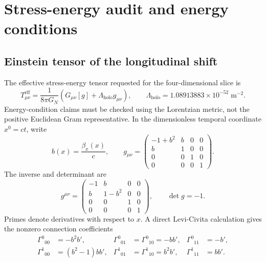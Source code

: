 \section{Stress-energy audit and energy conditions}\label{sec:stress-energy-audit}

\subsection{Einstein tensor of the longitudinal shift}

The effective stress-energy tensor requested for the four-dimensional slice is
\begin{equation}
  T_{\mu\nu}^{\mathrm{eff}}
  =
  \frac{1}{8\pi G_N}
  \left(
    G_{\mu\nu}[g]
    +
    \Lambda_{\mathrm{holo}}g_{\mu\nu}
  \right),
  \qquad
  \Lambda_{\mathrm{holo}}
  =
  1.08913883\times10^{-52}\;\mathrm{m^{-2}}.
  \label{eq:effective-stress-energy-definition}
\end{equation}
Energy-condition claims must be checked using the Lorentzian metric, not the
positive Euclidean Gram representative.  In the dimensionless temporal
coordinate \(x^0=ct\), write
\begin{equation}
  b(x)
  =
  \frac{\beta_x(x)}{c},
  \qquad
  g_{\mu\nu}
  =
  \begin{pmatrix}
    -1+b^2 & b & 0 & 0 \\
    b & 1 & 0 & 0 \\
    0 & 0 & 1 & 0 \\
    0 & 0 & 0 & 1
  \end{pmatrix}.
  \label{eq:section5-shift-metric}
\end{equation}
The inverse and determinant are
\begin{equation}
  g^{\mu\nu}
  =
  \begin{pmatrix}
    -1 & b & 0 & 0 \\
    b & 1-b^2 & 0 & 0 \\
    0 & 0 & 1 & 0 \\
    0 & 0 & 0 & 1
  \end{pmatrix},
  \qquad
  \det g
  =
  -1.
  \label{eq:section5-inverse-and-determinant}
\end{equation}
Primes denote derivatives with respect to \(x\).  A direct Levi-Civita
calculation gives the nonzero connection coefficients
\begin{equation}
  \begin{aligned}
  \Gamma^{0}{}_{00}
  &=
  -b^2b',
  &
  \Gamma^{0}{}_{01}
  &=
  \Gamma^{0}{}_{10}
  =
  -bb',
  &
  \Gamma^{0}{}_{11}
  &=
  -b',
  \\
  \Gamma^{1}{}_{00}
  &=
  (b^2-1)bb',
  &
  \Gamma^{1}{}_{01}
  &=
  \Gamma^{1}{}_{10}
  =
  b^2b',
  &
  \Gamma^{1}{}_{11}
  &=
  bb'.
  \end{aligned}
  \label{eq:shift-christoffel-symbols}
\end{equation}
